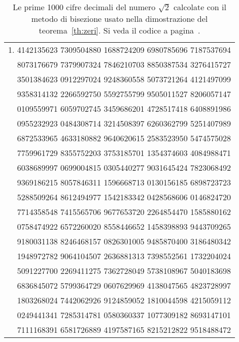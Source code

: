 \begin{table}
\begin{center}
\begin{tabular}{r}
1.\small
4142135623 7309504880 1688724209 6980785696 7187537694 \\ \small
8073176679 7379907324 7846210703 8850387534 3276415727 \\ \small
3501384623 0912297024 9248360558 5073721264 4121497099 \\ \small
9358314132 2266592750 5592755799 9505011527 8206057147 \\ \small
0109559971 6059702745 3459686201 4728517418 6408891986 \\ \small
0955232923 0484308714 3214508397 6260362799 5251407989 \\ \small
6872533965 4633180882 9640620615 2583523950 5474575028 \\ \small
7759961729 8355752203 3753185701 1354374603 4084988471 \\ \small
6038689997 0699004815 0305440277 9031645424 7823068492 \\ \small
9369186215 8057846311 1596668713 0130156185 6898723723 \\ \small
5288509264 8612494977 1542183342 0428568606 0146824720 \\ \small
7714358548 7415565706 9677653720 2264854470 1585880162 \\ \small
0758474922 6572260020 8558446652 1458398893 9443709265 \\ \small
9180031138 8246468157 0826301005 9485870400 3186480342 \\ \small
1948972782 9064104507 2636881313 7398552561 1732204024 \\ \small
5091227700 2269411275 7362728049 5738108967 5040183698 \\ \small
6836845072 5799364729 0607629969 4138047565 4823728997 \\ \small
1803268024 7442062926 9124859052 1810044598 4215059112 \\ \small
0249441341 7285314781 0580360337 1077309182 8693147101 \\ \small
7111168391 6581726889 4197587165 8215212822 9518488472
  \end{tabular}
\end{center}
\caption{Le prime 1000 cifre decimali del numero $\sqrt 2$
calcolate con il metodo di bisezione usato nella dimostrazione
del teorema~\ref{th:zeri}.
Si veda il codice a pagina~\pageref{code:bisection}.}
\label{fig:cifre_sqrt2}
\end{table}

